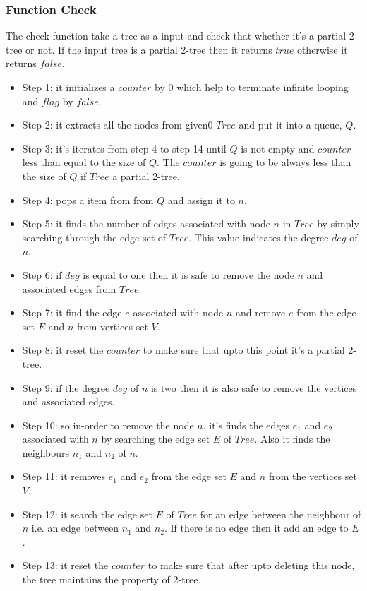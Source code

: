 \documentclass[12pt]{article}
\begin{document}
\subsubsection{Function Check}
The check function take a tree as a input and check that whether it's a partial 2-tree or not. If the input tree is a partial 2-tree then it returns $true$ otherwise it returns $false$.
\begin{itemize}[noitemsep]
\item Step 1: it initializes a $counter$ by 0 which help to terminate infinite looping and $flag$ by $false$.
\item Step 2: it extracts all the nodes from given0 $Tree$ and put it into a queue, $Q$.
\item Step 3: it's iterates from step 4 to step 14 until $Q$ is not empty and $counter$ less than equal to the size of $Q$. The $counter$ is going to be always less than the size of $Q$ if $Tree$ a partial 2-tree. 
\item Step 4: pops a item from from $Q$ and assign it to $n$.
\item Step 5: it finds the number of edges associated with node $n$ in $Tree$ by simply searching through the edge set of $Tree$. This value indicates the degree $deg$ of $n$.
\item Step 6: if $deg$ is equal to one then it is safe to remove the node $n$ and associated edges from $Tree$.
\item Step 7: it find the edge $e$ associated with node $n$ and remove $e$ from the edge set $E$ and $n$ from vertices set $V$.
\item Step 8: it reset the $counter$ to make sure that upto this point it's a partial $2$-tree.
\item Step 9: if the degree $deg$ of $n$ is two then it is also safe to remove the vertices and associated edges.
\item Step 10: so in-order to remove the node $n$, it's finds the edges $e_1$ and $e_2$ associated with $n$ by searching the edge set $E$ of $Tree$. Also it finds the neighbours $n_1$ and $n_2$ of $n$. 
\item Step 11: it removes $e_1$ and $e_2$ from the edge set $E$ and $n$ from the vertices set $V$.
\item Step 12: it search the edge set $E$ of $Tree$ for an edge between the neighbour of $n$ i.e. an edge between $n_1$ and $n_2$. If there is no edge then it add an edge to $E$.
\item Step 13: it reset the $counter$ to make sure that after upto deleting this node, the tree maintains the property of 2-tree.

\end{itemize}
\end{document}

